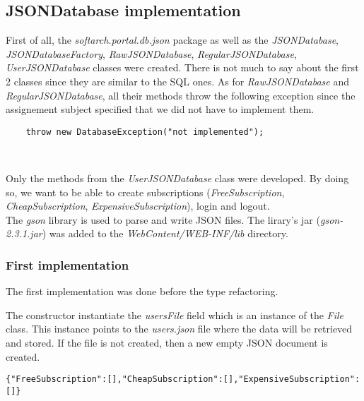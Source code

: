 \subsection{JSONDatabase implementation}

First of all, the \emph{softarch.portal.db.json} package as well as the
\emph{JSONDatabase}, \emph{JSONDatabaseFactory}, \emph{RawJSONDatabase},
\emph{RegularJSONDatabase}, \emph{UserJSONDatabase} classes were
created. There is not much to say about the first 2 classes since they
are similar to the SQL ones. As for \emph{RawJSONDatabase} and
\emph{RegularJSONDatabase}, all their methods throw the following exception
since the assignement subject specified that we did not have to implement them.\\

\begin{lstlisting}
    throw new DatabaseException("not implemented");
\end{lstlisting}
\

Only the methods from the \emph{UserJSONDatabase} class were developed.
By doing so, we want to be able to create subscriptions
(\emph{FreeSubscription}, \emph{CheapSubscription},
\emph{ExpensiveSubscription}), login and logout.\\

The \emph{gson}\cite{cite:gson} library is used to parse and write JSON files.
The lirary's jar (\emph{gson-2.3.1.jar}) was added to the
\emph{WebContent/WEB-INF/lib} directory.

\subsubsection{First implementation}

\begin{framewarning}
The first implementation was done before the type refactoring.
\end{framewarning}

The constructor instantiate the \emph{usersFile} field which is an
instance of the \emph{File} class. This instance points to the
\emph{users.json} file where the data will be retrieved and stored. If
the file is not created, then a new empty JSON document is created.\\

\begin{lstlisting}[caption={empty users.json document}]
{"FreeSubscription":[],"CheapSubscription":[],"ExpensiveSubscription":[]}
\end{lstlisting}
\

